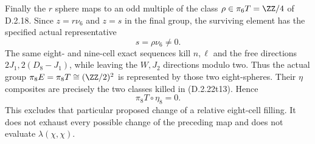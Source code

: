 Finally the $r$ sphere maps to an odd multiple of the
class $\rho\in\pi_6T=\ZZ/4$ of D.2.18.
Since $z=r\nu_6$ and $z=s$ in the final group, the
surviving element has the specified actual representative
\[
 s=\rho\nu_6\ne0.
 \tag{D.2.22t18}
\]
The same eight- and nine-cell exact sequences kill $n,\ell$
and the free directions $2J_1,2(D_8-J_1)$, while leaving
the $W,J_2$ directions modulo two.
Thus the actual group $\pi_8E=\pi_8T\cong(\ZZ/2)^2$ is
represented by those two eight-spheres.  Their $\eta$
composites are precisely the two classes killed in
\textup{(D.2.22t13)}.  Hence
\[
 \pi_8T\circ\eta_8=0.
 \tag{D.2.22t19}
\]
This excludes that particular proposed change of a relative
eight-cell filling.  It does not exhaust every possible change
of the preceding map and does not evaluate
$\lambda(\chi,\chi)$.

